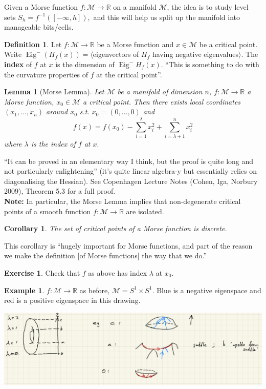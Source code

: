 \documentclass[10pt]{article}
\theoremstyle{plain}
\newtheorem{corollary}[thm]{Corollary}
\newtheorem{lemma}[thm]{Lemma}
\theoremstyle{definition}
\newtheorem{defn}[thm]{Definition} %
\newtheorem{exmp}[thm]{Example} %
\newtheorem{exercise}[thm]{Exercise}
\newcommand{\Note}{\textbf{Note: }}
\newcommand{\Real}{\mathbb{R}}
\newcommand{\man}{\mathcal{M}}
\newcommand{\xman}{x\in\man}
\newcommand{\sumfromto}[2]{\sum\limits_{#1}^{#2}}
\DeclareMathOperator{\Eig}{Eig}
\begin{document}
Given a Morse function $f : \man \to \Real$ on a manifold $\man$, the idea is to study level sets $S_h = f^{-1}([-\infty,h]),$ and this will help us split up the manifold into manageable bits/cells.

\begin{defn}
    Let $f:\man \to\Real$ be a Morse function and $\xman$ be a critical point. Write $\Eig^-(H_f(x)) = \langle $eigenvectors of $H_f$ having negative eigenvalues$\rangle$. The \textbf{index} of $f$ at $x$ is the dimension of $\Eig^-H_f(x)$. ``This is something to do with the curvature properties of $f$ at the critical point''.
\end{defn}

\begin{lemma}[Morse Lemma]\label{lem:MorseLemma}
    Let $\man$ be a manifold of dimension $n$, $f:\man \to \Real$ a Morse function, $x_0 \in \man$ a critical point. Then there exists local coordinates $(x_1,\ldots,x_n)$ around $x_0$ s.t. $x_0 = (0,\ldots,0)$ and 
    $$f(x) = f(x_0) - \sumfromto{i=1}{\lambda} x_i^2 + \sumfromto{i=\lambda+1}{n} x_i^2$$
    where $\lambda$ is the index of $f$ at $x.$
\end{lemma}
``It can be proved in an elementary way I think, but the proof is quite long and not particularly enlightening'' (it's quite linear algebra-y but essentially relies on diagonalising the Hessian). See Copenhagen Lecture Notes (Cohen, Iga, Norbury 2009), Theorem 5.3 for a full proof.\\
\Note In particular, the Morse Lemma implies that non-degenerate critical points of a smooth function $f : \man \to \Real$ are isolated.

\begin{corollary}
    The set of critical points of a Morse function is discrete.
\end{corollary}\noindent
This corollary is ``hugely important for Morse functions, and part of the reason we make the definition [of Morse functions] the way that we do.''

\begin{exercise}
    Check that $f$ as above has index $\lambda$ at $x_0$.
\end{exercise}

\begin{exmp}
    $f:\man \to \Real$ as before, $\man = S^1 \times S^1$. Blue is a negative eigenspace and red is a positive eigenspace in this drawing.
    \begin{center}
        \includegraphics[width=\textwidth]{Images/MorseTorusEigenvalues.png}
    \end{center}
\end{exmp}
\end{document}
